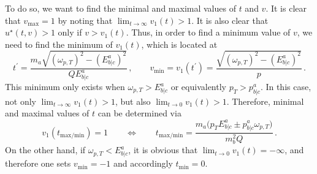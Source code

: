 To do so, we want to find the minimal and maximal values of $t$ and $v$. It is clear that ${v_{\text{max}}=1}$ by noting that ${\lim_{t\to\infty}v_1(t)>1}$. It is also clear that ${u^\star(t,v)>1}$ only if ${v>v_1(t)}$. Thus, in order to find a minimum value of $v$, we need to find the minimum of $v_1(t)$, which is located at
\begin{equation}
    t^\prime=\frac{m_a\sqrt{(\omega_{p,T})^2-(E^a_{b\vert c})^2}}{QE^a_{b\vert c}}\,,\qquad v_{\text{min}}=v_1(t^\prime)=\frac{\sqrt{(\omega_{p,T})^2-(E^a_{b\vert c})^2}}{p}\,.
    \label{eq:Cubature_vmin}
\end{equation}
This minimum only exists when ${\omega_{p,T}>E^a_{b\vert c}}$ or equivalently ${p_T>p^a_{b\vert c}}$. In this case, not only ${\lim_{t\to\infty}v_1(t)>1}$, but also ${\lim_{t\to0}v_1(t)>1}$. Therefore, minimal and maximal values of $t$ can be determined via
\begin{equation}
    v_1(t_{\text{max/min}})=1\qquad\iff\qquad t_{\text{max/min}}=\frac{m_a\big(p_TE^a_{b\vert c}\pm p^a_{b\vert c}\omega_{p,T}\big)}{m_b^2Q}\,.
    \label{eq:Cubature_tminmax}
\end{equation}
On the other hand, if ${\omega_{p,T}<E^a_{b\vert c}}$, it is obvious that ${\lim_{t\to0}v_1(t)=-\infty}$, and therefore one sets ${v_{\text{min}}=-1}$ and accordingly ${t_{\text{min}}=0}$.

